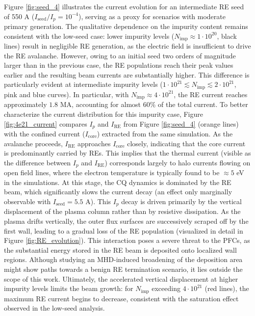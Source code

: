 \documentclass[aip,reprint]{revtex4-1}
\begin{document}
Figure \ref{fig:seed_4} illustrates the current evolution for an intermediate RE seed of 550 A ($I_\text{seed}/I_p = 10^{-4}$), serving as a proxy for scenarios with moderate primary generation. The qualitative dependence on the impurity content remains consistent with the low-seed case: lower impurity levels ($N_\text{imp} \approx 1\cdot10^{20}$, black lines) result in negligible RE generation, as the electric field is insufficient to drive the RE avalanche.
However, owing to an initial seed two orders of magnitude larger than in the previous case, the RE populations reach their peak values earlier and the resulting beam currents are substantially higher. This difference is particularly evident at intermediate impurity levels ($1\cdot10^{21} \lesssim N_\text{imp} \lesssim 2\cdot10^{21}$, pink and blue curves). In particular, with $N_\text{imp} \approx 4\cdot10^{21}$, the RE current reaches approximately $1.8$ MA, accounting for almost $60\%$ of the total current. To better characterize the current distribution for this impurity case, Figure \ref{fig:4e21_current} compares $I_p$ and $I_\text{RE}$ from Figure \ref{fig:seed_4} (orange lines) with the confined current ($I_\text{core}$) extracted from the same simulation. As the avalanche proceeds, $I_\text{RE}$ approaches $I_\text{core}$ closely, indicating that the core current is predominantly carried by REs. This implies that the thermal current (visible as the difference between $I_p$ and $I_\text{RE}$) corresponds largely to halo currents flowing on open field lines, where the electron temperature is typically found to be $\approx 5$ eV in the simulations. At this stage, the CQ dynamics is dominated by the RE beam, which significantly slows the current decay (an effect only marginally observable with $I_\text{seed}= 5.5$ A). This $I_p$ decay is driven primarily by the vertical displacement of the plasma column rather than by resistive dissipation. As the plasma drifts vertically, the outer flux surfaces are successively scraped off by the first wall, leading to a gradual loss of the RE population (visualized in detail in Figure \ref{fig:RE_evolution}). This interaction poses a severe threat to the PFCs, as the substantial energy stored in the RE beam is deposited onto localized wall regions. Although studying an MHD-induced broadening of the deposition area might show paths towards a benign RE termination scenario, it lies outside the scope of this work.
Ultimately, the accelerated vertical displacement at higher impurity levels limits the beam growth: for $N_\text{imp}$ exceeding $4\cdot10^{21}$ (red lines), the maximum RE current begins to decrease, consistent with the saturation effect observed in the low-seed analysis.
\end{document}
